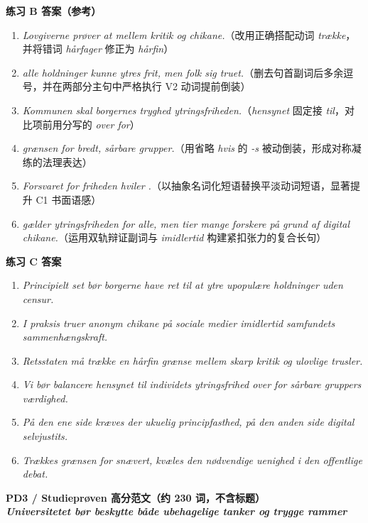 \begin{answerbox}
\textbf{练习 B 答案（参考）}
\begin{enumerate}
  \item \textit{Lovgiverne prøver at  mellem kritik og chikane.}（改用正确搭配动词 \textit{trække}，并将错词 \textit{hårfager} 修正为 \textit{hårfin}）
  \item \textit{ alle holdninger kunne ytres frit, men  folk sig truet.}（删去句首副词后多余逗号，并在两部分主句中严格执行 V2 动词提前倒装）
  \item \textit{Kommunen skal  borgernes tryghed  ytringsfriheden.}（\textit{hensynet} 固定接 \textit{til}，对比项前用分写的 \textit{over for}）
  \item \textit{ grænsen for bredt,  sårbare grupper.}（用省略 \textit{hvis} 的 \textit{-s} 被动倒装，形成对称凝练的法理表达）
  \item \textit{Forsvaret for friheden hviler .}（以抽象名词化短语替换平淡动词短语，显著提升 C1 书面语感）
  \item \textit{ gælder ytringsfriheden for alle, men  tier mange forskere  på grund af digital chikane.}（运用双轨辩证副词与 \textit{imidlertid} 构建紧扣张力的复合长句）
\end{enumerate}

\textbf{练习 C 答案}
\begin{enumerate}
  \item \textit{Principielt set bør borgerne have ret til at ytre upopulære holdninger uden censur.}
  \item \textit{I praksis truer anonym chikane på sociale medier imidlertid samfundets sammenhængskraft.}
  \item \textit{Retsstaten må trække en hårfin grænse mellem skarp kritik og ulovlige trusler.}
  \item \textit{Vi bør balancere hensynet til individets ytringsfrihed over for sårbare gruppers værdighed.}
  \item \textit{På den ene side kræves der ukuelig principfasthed, på den anden side digital selvjustits.}
  \item \textit{Trækkes grænsen for snævert, kvæles den nødvendige uenighed i den offentlige debat.}
\end{enumerate}

\textbf{PD3 / Studieprøven 高分范文（约 230 词，不含标题）}\\
\textit{\textbf{Universitetet bør beskytte både ubehagelige tanker og trygge rammer}}


\end{answerbox}
